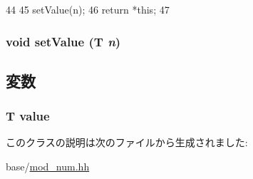 \begin{DoxyCode}
44                           {
45         setValue(n);
46         return *this;
47     }
\end{DoxyCode}
\hypertarget{classModNum_aa364efa60a7b2776a6742997dbd0834b}{
\subsubsection[{setValue}]{\setlength{\rightskip}{0pt plus 5cm}void setValue (T {\em n})}}
\label{classModNum_aa364efa60a7b2776a6742997dbd0834b}





\subsection{変数}
\hypertarget{classModNum_a4fc7f59e3113e19697159919a5aad095}{
\subsubsection[{value}]{\setlength{\rightskip}{0pt plus 5cm}T {\bf value}}}
\label{classModNum_a4fc7f59e3113e19697159919a5aad095}


このクラスの説明は次のファイルから生成されました:\begin{DoxyCompactItemize}
\item 
base/\hyperlink{mod__num_8hh}{mod\_\-num.hh}\end{DoxyCompactItemize}
